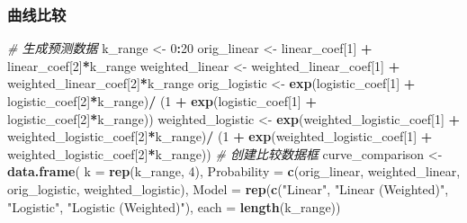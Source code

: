 \documentclass[
]{article}
\newenvironment{Shaded}{\begin{snugshade}}{\end{snugshade}}
\newcommand{\AttributeTok}[1]{\textcolor[rgb]{0.13,0.29,0.53}{#1}}
\newcommand{\CommentTok}[1]{\textcolor[rgb]{0.56,0.35,0.01}{\textit{#1}}}
\newcommand{\DecValTok}[1]{\textcolor[rgb]{0.00,0.00,0.81}{#1}}
\newcommand{\FunctionTok}[1]{\textcolor[rgb]{0.13,0.29,0.53}{\textbf{#1}}}
\newcommand{\NormalTok}[1]{#1}
\newcommand{\OtherTok}[1]{\textcolor[rgb]{0.56,0.35,0.01}{#1}}
\newcommand{\SpecialCharTok}[1]{\textcolor[rgb]{0.81,0.36,0.00}{\textbf{#1}}}
\newcommand{\StringTok}[1]{\textcolor[rgb]{0.31,0.60,0.02}{#1}}
\begin{document}
\subsubsection{曲线比较}\label{ux66f2ux7ebfux6bd4ux8f83}

\begin{Shaded}
\begin{Highlighting}[]
\CommentTok{\# 生成预测数据}
\NormalTok{k\_range }\OtherTok{\textless{}{-}} \DecValTok{0}\SpecialCharTok{:}\DecValTok{20}
\NormalTok{orig\_linear }\OtherTok{\textless{}{-}}\NormalTok{ linear\_coef[}\DecValTok{1}\NormalTok{] }\SpecialCharTok{+}\NormalTok{ linear\_coef[}\DecValTok{2}\NormalTok{]}\SpecialCharTok{*}\NormalTok{k\_range}
\NormalTok{weighted\_linear }\OtherTok{\textless{}{-}}\NormalTok{ weighted\_linear\_coef[}\DecValTok{1}\NormalTok{] }\SpecialCharTok{+}\NormalTok{ weighted\_linear\_coef[}\DecValTok{2}\NormalTok{]}\SpecialCharTok{*}\NormalTok{k\_range}
\NormalTok{orig\_logistic }\OtherTok{\textless{}{-}} \FunctionTok{exp}\NormalTok{(logistic\_coef[}\DecValTok{1}\NormalTok{] }\SpecialCharTok{+}\NormalTok{ logistic\_coef[}\DecValTok{2}\NormalTok{]}\SpecialCharTok{*}\NormalTok{k\_range)}\SpecialCharTok{/}
\NormalTok{(}\DecValTok{1} \SpecialCharTok{+} \FunctionTok{exp}\NormalTok{(logistic\_coef[}\DecValTok{1}\NormalTok{] }\SpecialCharTok{+}\NormalTok{ logistic\_coef[}\DecValTok{2}\NormalTok{]}\SpecialCharTok{*}\NormalTok{k\_range))}
\NormalTok{weighted\_logistic }\OtherTok{\textless{}{-}} \FunctionTok{exp}\NormalTok{(weighted\_logistic\_coef[}\DecValTok{1}\NormalTok{] }\SpecialCharTok{+}\NormalTok{ weighted\_logistic\_coef[}\DecValTok{2}\NormalTok{]}\SpecialCharTok{*}\NormalTok{k\_range)}\SpecialCharTok{/}
\NormalTok{(}\DecValTok{1} \SpecialCharTok{+} \FunctionTok{exp}\NormalTok{(weighted\_logistic\_coef[}\DecValTok{1}\NormalTok{] }\SpecialCharTok{+}\NormalTok{ weighted\_logistic\_coef[}\DecValTok{2}\NormalTok{]}\SpecialCharTok{*}\NormalTok{k\_range))}
\CommentTok{\# 创建比较数据框}
\NormalTok{curve\_comparison }\OtherTok{\textless{}{-}} \FunctionTok{data.frame}\NormalTok{(}
\AttributeTok{k =} \FunctionTok{rep}\NormalTok{(k\_range, }\DecValTok{4}\NormalTok{),}
\AttributeTok{Probability =} \FunctionTok{c}\NormalTok{(orig\_linear, weighted\_linear, orig\_logistic, weighted\_logistic),}
\AttributeTok{Model =} \FunctionTok{rep}\NormalTok{(}\FunctionTok{c}\NormalTok{(}\StringTok{"Linear"}\NormalTok{, }\StringTok{"Linear (Weighted)"}\NormalTok{, }\StringTok{"Logistic"}\NormalTok{, }\StringTok{"Logistic (Weighted)"}\NormalTok{),}
\AttributeTok{each =} \FunctionTok{length}\NormalTok{(k\_range))}

\end{Highlighting}
\end{Shaded}
\end{document}
